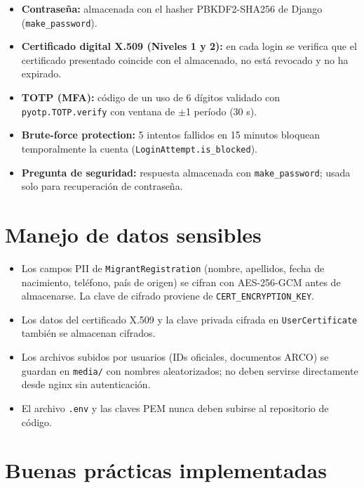 \documentclass[10pt,letterpaper]{report}
\begin{document}
\begin{itemize}[leftmargin=*]
    \item \textbf{Contraseña:} almacenada con el hasher PBKDF2-SHA256 de Django (\texttt{make\_password}).
    \item \textbf{Certificado digital X.509 (Niveles 1 y 2):} en cada login se verifica que el certificado presentado coincide con el almacenado, no está revocado y no ha expirado.
    \item \textbf{TOTP (MFA):} código de un uso de 6 dígitos validado con \texttt{pyotp.TOTP.verify} con ventana de $\pm$1 período (30 s).
    \item \textbf{Brute-force protection:} 5 intentos fallidos en 15 minutos bloquean temporalmente la cuenta (\texttt{LoginAttempt.is\_blocked}).
    \item \textbf{Pregunta de seguridad:} respuesta almacenada con \texttt{make\_password}; usada solo para recuperación de contraseña.
\end{itemize}

\section{Manejo de datos sensibles}

\begin{itemize}[leftmargin=*]
    \item Los campos PII de \texttt{MigrantRegistration} (nombre, apellidos, fecha de nacimiento, teléfono, país de origen) se cifran con AES-256-GCM antes de almacenarse. La clave de cifrado proviene de \texttt{CERT\_ENCRYPTION\_KEY}.
    \item Los datos del certificado X.509 y la clave privada cifrada en \texttt{UserCertificate} también se almacenan cifrados.
    \item Los archivos subidos por usuarios (IDs oficiales, documentos ARCO) se guardan en \texttt{media/} con nombres aleatorizados; no deben servirse directamente desde nginx sin autenticación.
    \item El archivo \texttt{.env} y las claves PEM nunca deben subirse al repositorio de código.
\end{itemize}

\section{Buenas prácticas implementadas}
\end{document}
